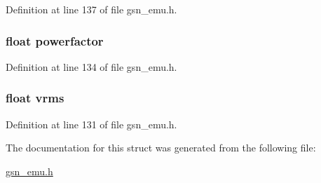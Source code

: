 Definition at line 137 of file gsn\_\-emu.h.

\hypertarget{a00060_a29927bc0ca13e270d492593d749bf42e}{
\subsubsection[{powerfactor}]{\setlength{\rightskip}{0pt plus 5cm}float {\bf powerfactor}}}
\label{a00060_a29927bc0ca13e270d492593d749bf42e}


Definition at line 134 of file gsn\_\-emu.h.

\hypertarget{a00060_a1466cf22de01e2faf786b69e44e4902f}{
\subsubsection[{vrms}]{\setlength{\rightskip}{0pt plus 5cm}float {\bf vrms}}}
\label{a00060_a1466cf22de01e2faf786b69e44e4902f}


Definition at line 131 of file gsn\_\-emu.h.



The documentation for this struct was generated from the following file:\begin{DoxyCompactItemize}
\item 
\hyperlink{a00489}{gsn\_\-emu.h}\end{DoxyCompactItemize}
